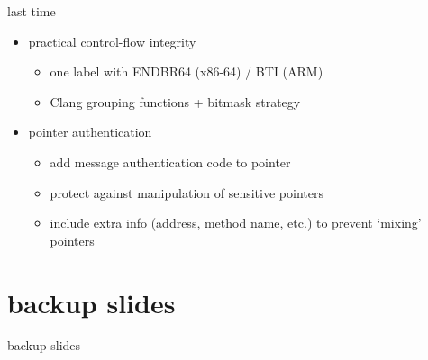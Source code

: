 \date{}
\title{}
\date{}
\usepackage[outputdir=latex.out]{minted}

\begin{frame}
    \titlepage
\end{frame}
\usetikzlibrary{arrows.meta,calc,shapes.callouts,positioning}


\begin{frame}{last time}
    \begin{itemize}
    \item practical control-flow integrity
        \begin{itemize}
        \item one label with ENDBR64 (x86-64) / BTI (ARM)
        \item Clang grouping functions + bitmask strategy
        \end{itemize}
    \item pointer authentication
        \begin{itemize}
        \item add message authentication code to pointer
        \item protect against manipulation of sensitive pointers
        \item include extra info (address, method name, etc.) to prevent `mixing' pointers
        \end{itemize}
    \end{itemize}
\end{frame}



\section{backup slides}
\begin{frame}{backup slides}
\end{frame}





